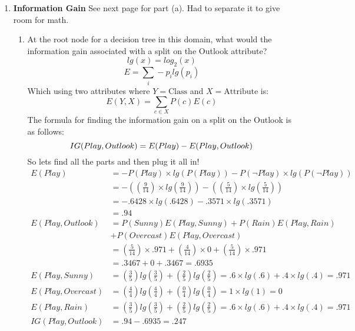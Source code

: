 \documentclass[12pt]{article}
\begin{document}
\begin{enumerate}
\item \textbf{Information Gain} See next page for part (a). Had to separate it to give room for math.
\newpage
\begin{enumerate}
\item At the root node for a decision tree in this domain, what would the information gain associated with a split on the Outlook attribute?\\
\begin{equation*}
lg(x) = log_2(x)
\end{equation*}
\begin{equation*}
E = \sum_i - p_i lg(p_i)
\end{equation*}
Which using two attributes where $Y = \text{Class}$ and $X = \text{Attribute}$ is:\\
\begin{equation*}
E(Y, X) = \sum_{c \in X} P(c) E(c)
\end{equation*}
The formula for finding the information gain on a split on the Outlook is as follows:
\begin{equation*}
IG(Play, Outlook) = E(Play) - E(Play, Outlook)\\
\end{equation*}
So lets find all the parts and then plug it all in!
\begin{align*}
E(Play) &= - P(Play) \times lg(P(Play)) - P(\neg Play) \times lg(P(\neg Play))\\
&= - ((\frac{9}{14}) \times lg(\frac{9}{14})) - ((\frac{5}{14}) \times lg(\frac{5}{14}))\\
&= -.6428 \times lg(.6428) - .3571 \times lg(.3571)\\
&= .94\\
E(Play, Outlook) &= P(Sunny)E(Play, Sunny) + P(Rain)E(Play, Rain)\\
& + P(Overcast)E(Play, Overcast) \\
&= (\frac{5}{14}) \times .971 + (\frac{4}{14}) \times 0 + (\frac{5}{14}) \times .971\\
&= .3467 + 0 + .3467 = .6935\\
E(Play, Sunny) &= (\frac{3}{5})lg(\frac{3}{5}) + (\frac{2}{5})lg(\frac{2}{5})
= .6 \times lg(.6) + .4 \times lg(.4)
= .971\\
E(Play, Overcast) &= (\frac{4}{4})lg(\frac{4}{4}) + (\frac{0}{4})lg(\frac{0}{4})
= 1 \times lg(1)
= 0\\
E(Play, Rain) &= (\frac{3}{5})lg(\frac{3}{5}) + (\frac{2}{5})lg(\frac{2}{5})
= .6 \times lg(.6) + .4 \times lg(.4)
= .971\\
IG(Play, Outlook) &= .94 - .6935 = \boxed{.247}
\end{align*}


\end{enumerate}
\end{enumerate}
\end{document}
